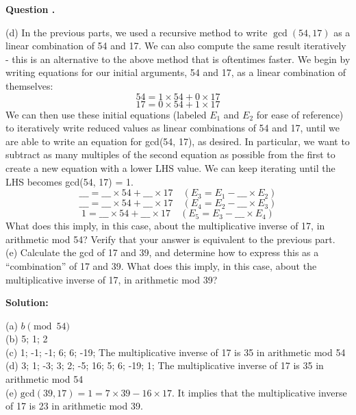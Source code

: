 \documentclass[12pt]{article}
\newcounter{questionnumber}
\newenvironment{question}[1][]{\stepcounter{questionnumber}\par\noindent\textbf{Question \thequestionnumber. #1}\par}{\par}
\newenvironment{solution}{\par\noindent\textbf{Solution:}\par}{\par\vspace{1em}}
\begin{document}
\begin{question}
    (d) In the previous parts, we used a recursive method to write $\gcd(54, 17)$ as a linear combination of 54 and 17. We can also compute the same result iteratively - this is an alternative to the above method that is oftentimes faster. We begin by writing equations for our initial arguments, 54 and 17, as a linear combination of themselves:
    $$54 = 1 \times 54 + 0 \times 17$$
    $$
    17 = 0 \times 54 + 1 \times 17$$
    We can then use these initial equations (labeled $E_1$ and $E_2$ for ease of reference) to iteratively write reduced values as linear combinations of 54 and 17, until we are able to write an equation for gcd(54, 17), as desired.
    In particular, we want to subtract as many multiples of the second equation as possible from the first to create a new equation with a lower LHS value. We can keep iterating until the LHS becomes gcd(54, 17) = 1.
    $$\_\_\_ = \_\_\_ \times 54 + \_\_\_ \times 17 \quad (E_3 = E_1 - \_\_\_ \times E_2)$$
    $$
    \_\_\_ = \_\_\_ \times 54 + \_\_\_ \times 17 \quad (E_4 = E_2 - \_\_\_ \times E_3)$$
    $$1 = \_\_\_ \times 54 + \_\_\_ \times 17 \quad (E_5 = E_3 - \_\_\_ \times E_4)$$
    What does this imply, in this case, about the multiplicative inverse of 17, in arithmetic mod 54? Verify that your answer is equivalent to the previous part.\\
    (e) Calculate the gcd of 17 and 39, and determine how to express this as a ``combination'' of 17 and 39. What does this imply, in this case, about the multiplicative inverse of 17, in arithmetic mod 39?
\end{question}
\begin{solution}
    \noindent
    (a) $b \pmod{54}$\\
    (b) 5; 1; 2\\
    (c) 1; -1; -1; 6; 6; -19; The multiplicative inverse of 17 is 35 in arithmetic mod 54\\
    (d) 3; 1; -3; 3; 2; -5; 16; 5; 6; -19; 1; The multiplicative inverse of 17 is 35 in arithmetic mod 54\\
    (e) $\mathrm{gcd}\left( 39,17 \right) =1=7\times 39-16\times 17$. It implies that the multiplicative inverse of 17 is 23 in arithmetic mod 39.
\end{solution}
\end{document}
